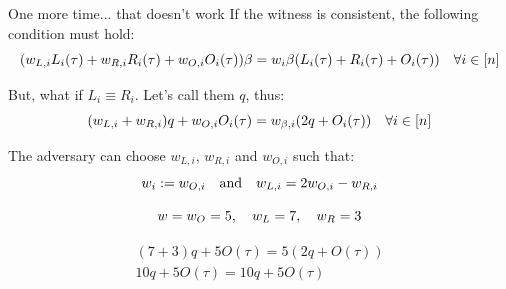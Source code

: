 \documentclass{zkdl-presentation-template}
\begin{document}
    \begin{frame}{One more time... that doesn't work}
        If the witness is consistent, the following condition must hold:
        \vspace{-3pt}
        {\small \begin{equation*}
            (w_{L,i}L_i(\tau) + w_{R,i}R_i(\tau) + w_{O,i}O_i(\tau))\beta = w_i\beta(L_i(\tau) + R_i(\tau) + O_i(\tau)) \quad \forall i \in [n]
            \vspace{-10pt}
        \end{equation*}}
        
        \pause
        But, what if $L_i \equiv R_i$. Let's call them $q$, thus:
        \vspace{-3pt}
        \begin{equation*}
            (w_{L,i} + w_{R,i})q + w_{O,i}O_i(\tau)= w_{\beta,i}(2q + O_i(\tau)) \quad \forall i \in [n]
            \vspace{-10pt}
        \end{equation*}

        \pause
        The adversary can choose $w_{L,i}$, $w_{R,i}$ and $w_{O,i}$ such that:
        \vspace{-5pt}
        \begin{equation*}
            w_i := w_{O,i} \quad \text{and} \quad w_{L,i}=2w_{O,i} - w_{R,i}
            \vspace{-5pt}
        \end{equation*} 

        \pause
        \begin{example}
            \begin{equation*}
                w = w_O = 5, \quad w_L = 7, \quad w_R = 3
                \vspace{-25pt}
            \end{equation*}

            \begin{align*}
                (7 + 3)q + 5O(\tau) = 5(2q + O(\tau)) \\
                10q + 5O(\tau) = 10q + 5O(\tau)
            \end{align*}
        \end{example}
    \end{frame}
\end{document}
